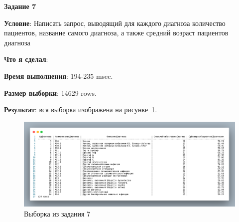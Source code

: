 \newpage


\begin{center}
  \textbf{Задание 7}
\end{center}
  
\textbf{Условие}:
Написать запрос, выводящий для каждого диагноза количество пациентов, название
самого диагноза, а также средний возраст пациентов диагноза

\textbf{Что я сделал}:



\textbf{Время выполнения}: 194-235 msec.

\textbf{Размер выборки}: 14629 rows.

\textbf{Результат}: вся выборка изображена на рисунке~\ref{fig:t7}.

\begin{figure}[!h]
  \centering

  \includegraphics[width=16cm]
  {../sql/task7/7-out.png}

  \caption{Выборка из задания 7}

  \label{fig:t7}
\end{figure}

\newpage


















\newpage
